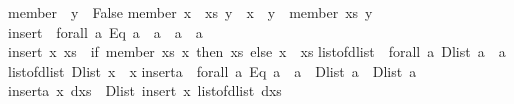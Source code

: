 \begin{isabellebody}
\begin{isamarkuptext}
member\ {}{}\ y\ {}\ False{}\isanewline
member\ {}x\ {}\ xs{}\ y\ {}\ x\ {}{}\ y\ {}{}\ member\ xs\ y{}\isanewline
\isanewline
insert\ {}{}\ forall\ a{}\ {}Eq\ a{}\ {}{}\ a\ {}{}\ {}a{}\ {}{}\ {}a{}{}\isanewline
insert\ x\ xs\ {}\ {}if\ member\ xs\ x\ then\ xs\ else\ x\ {}\ xs{}{}\isanewline
\isanewline
list{}of{}dlist\ {}{}\ forall\ a{}\ Dlist\ a\ {}{}\ {}a{}{}\isanewline
list{}of{}dlist\ {}Dlist\ x{}\ {}\ x{}\isanewline
\isanewline
inserta\ {}{}\ forall\ a{}\ {}Eq\ a{}\ {}{}\ a\ {}{}\ Dlist\ a\ {}{}\ Dlist\ a{}\isanewline
inserta\ x\ dxs\ {}\ Dlist\ {}insert\ x\ {}list{}of{}dlist\ dxs{}{}{}\isanewline

\end{isamarkuptext}
\end{isabellebody}
